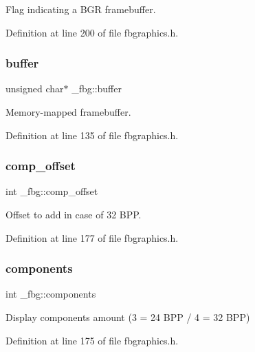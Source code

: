 Flag indicating a B\+GR framebuffer. 



Definition at line 200 of file fbgraphics.\+h.

\mbox{\label{struct__fbg_abd19f36337c99f866e03eb88f6c2a9d5}} 
\subsubsection{\texorpdfstring{buffer}{buffer}}
{\footnotesize\ttfamily unsigned char$\ast$ \+\_\+fbg\+::buffer}



Memory-\/mapped framebuffer. 



Definition at line 135 of file fbgraphics.\+h.

\mbox{\label{struct__fbg_a7c2e64d2f40575c8a989c759c30acb0e}} 
\subsubsection{\texorpdfstring{comp\+\_\+offset}{comp\_offset}}
{\footnotesize\ttfamily int \+\_\+fbg\+::comp\+\_\+offset}



Offset to add in case of 32 B\+PP. 



Definition at line 177 of file fbgraphics.\+h.

\mbox{\label{struct__fbg_a1db77a2ef506723a575644dbc1cfb747}} 
\subsubsection{\texorpdfstring{components}{components}}
{\footnotesize\ttfamily int \+\_\+fbg\+::components}



Display components amount (3 = 24 B\+PP / 4 = 32 B\+PP) 



Definition at line 175 of file fbgraphics.\+h.

